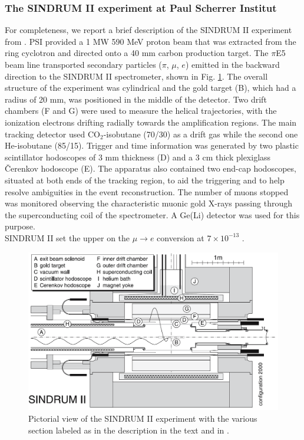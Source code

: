 \documentclass[12pt,a4paper,openright, oneside, titlepage]{book} %
\begin{document}
\subsubsection{The SINDRUM II experiment at Paul Scherrer Institut}
For completeness, we report a brief description of the SINDRUM II experiment from \cite{SINDRUMII}. 
PSI provided a 1 MW 590 MeV proton beam that was extracted from the ring cyclotron and directed onto a 40 mm carbon production target. 
The $\pi$E5 beam line transported secondary particles ($\pi$, $\mu$, $e$) emitted in the backward direction to the SINDRUM II spectrometer, shown in Fig. \ref{_SINDRUM_II}.
The overall structure of the experiment was cylindrical and the gold target (B), which had a radius of 20 mm, was positioned in the middle of the detector. 
Two drift chambers (F and G) were used to measure the helical trajectories, with the ionization electrons drifting radially towards the amplification regions. 
The main tracking detector used CO$_2$-isobutane (70/30) as a drift gas while the second one He-isobutane (85/15).
Trigger and time information was generated by two plastic scintillator hodoscopes of 3 mm thickness (D) and a 3 cm thick plexiglass \v{C}erenkov hodoscope (E). 
The apparatus also contained two end-cap hodoscopes, situated at both ends of the tracking region, to aid the triggering and to help resolve ambiguities in the event reconstruction. 
The number of muons stopped was monitored observing the characteristic muonic gold X-rays passing through the superconducting coil of the spectrometer. 
A Ge(Li) detector was used for this purpose.\\
SINDRUM II set the upper on the $\mu\rightarrow e$ conversion at $7\times10^{-13}$ \cite{SINDRUMII}.\\

\begin{figure}[h!]
\centering
\includegraphics[scale=0.6]{SINDRUM_II}
\caption[SINDRUM II]{Pictorial view of the SINDRUM II experiment with the various section labeled as in the description in the text and in \cite{SINDRUMII}.}
\label{_SINDRUM_II}
\end{figure}
\end{document}
